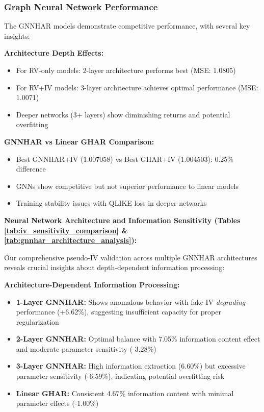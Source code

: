 \documentclass[12pt,a4paper]{article}
\begin{document}
\subsubsection{Graph Neural Network Performance}

The GNNHAR models demonstrate competitive performance, with several key insights:

\textbf{Architecture Depth Effects:} 
\begin{itemize}
\item For RV-only models: 2-layer architecture performs best (MSE: 1.0805)
\item For RV+IV models: 3-layer architecture achieves optimal performance (MSE: 1.0071)
\item Deeper networks (3+ layers) show diminishing returns and potential overfitting
\end{itemize}

\textbf{GNNHAR vs Linear GHAR Comparison:}
\begin{itemize}
\item Best GNNHAR+IV (1.007058) vs Best GHAR+IV (1.004503): 0.25\% difference
\item GNNs show competitive but not superior performance to linear models
\item Training stability issues with QLIKE loss in deeper networks
\end{itemize}

\textbf{Neural Network Architecture and Information Sensitivity (Tables \ref{tab:iv_sensitivity_comparison} \& \ref{tab:gnnhar_architecture_analysis}):}

Our comprehensive pseudo-IV validation across multiple GNNHAR architectures reveals crucial insights about depth-dependent information processing:

\textbf{Architecture-Dependent Information Processing:}
\begin{itemize}
\item \textbf{1-Layer GNNHAR:} Shows anomalous behavior with fake IV \textit{degrading} performance (+6.62\%), suggesting insufficient capacity for proper regularization
\item \textbf{2-Layer GNNHAR:} Optimal balance with 7.05\% information content effect and moderate parameter sensitivity (-3.28\%)
\item \textbf{3-Layer GNNHAR:} High information extraction (6.60\%) but excessive parameter sensitivity (-6.59\%), indicating potential overfitting risk
\item \textbf{Linear GHAR:} Consistent 4.67\% information content with minimal parameter effects (-1.00\%)
\end{itemize}
\end{document}
